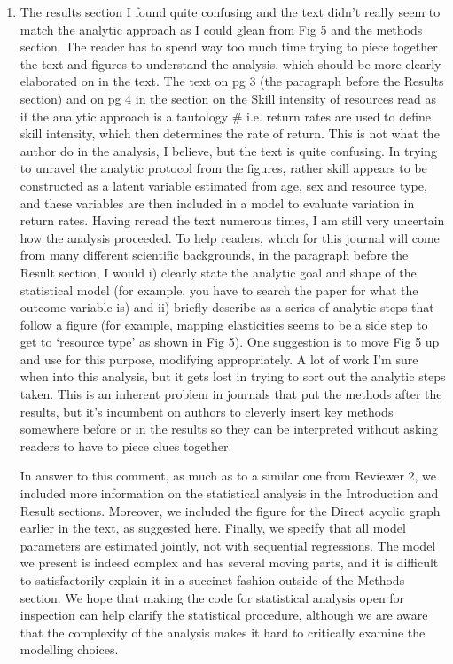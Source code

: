 \documentclass{article}
\newcommand{\rev}[1]{{\color{ForestGreen}#1}}
\begin{document}
\begin{enumerate}
    \item The results section I found quite confusing and the text didn’t really seem to match the analytic approach as I could glean from Fig 5 and the methods section. The reader has to spend way too much time trying to piece together the text and figures to understand the analysis, which should be more clearly elaborated on in the text. The text on pg 3 (the paragraph before the Results section) and on pg 4 in the section on the Skill intensity of resources read as if the analytic approach is a tautology \# i.e. return rates are used to define skill intensity, which then determines the rate of return. This is not what the author do in the analysis, I believe, but the text is quite confusing. In trying to unravel the analytic protocol from the figures, rather skill appears to be constructed as a latent variable estimated from age, sex and resource type, and these variables are then included in a model to evaluate variation in return rates. Having reread the text numerous times, I am still very uncertain how the analysis proceeded. To help readers, which for this journal will come from many different scientific backgrounds, in the paragraph before the Result section, I would i) clearly state the analytic goal and shape of the statistical model (for example, you have to search the paper for what the outcome variable is) and ii) briefly describe as a series of analytic steps that follow a figure (for example, mapping elasticities seems to be a side step to get to ‘resource type’ as shown in Fig 5). One suggestion is to move Fig 5 up and use for this purpose, modifying appropriately. A lot of work I’m sure when into this analysis, but it gets lost in trying to sort out the analytic steps taken. This is an inherent problem in journals that put the methods after the results, but it’s incumbent on authors to cleverly insert key methods somewhere before or in the results so they can be interpreted without asking readers to have to piece clues together.
    
    \rev{In answer to this comment, as much as to a similar one from Reviewer 2, we included more information on the statistical analysis in the Introduction and Result sections. Moreover, we included the figure for the Direct acyclic graph earlier in the text, as suggested here. Finally, we specify that all model parameters are estimated jointly, not with sequential regressions. The model we present is indeed complex and has several moving parts, and it is difficult to satisfactorily explain it in a succinct fashion outside of the Methods section. We hope that making the code for statistical analysis open for inspection can help clarify the statistical procedure, although we are aware that the complexity of the analysis makes it hard to critically examine the modelling choices. }
    

\end{enumerate}
\end{document}
